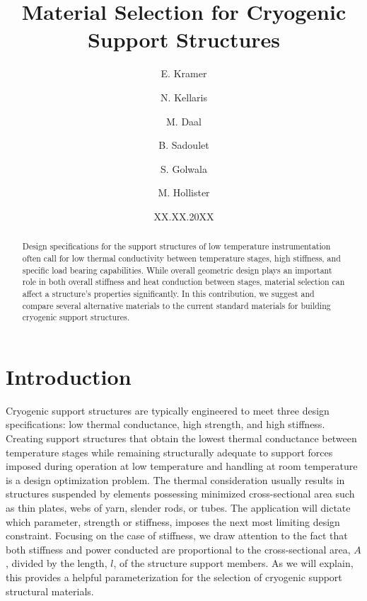 \documentclass[final]{svjour2}
\begin{document}
\newcommand{\hdblarrow}{H\makebox[0.9ex][l]{$\downdownarrows$}-}
\title{Material Selection for Cryogenic Support Structures}

\author{E. Kramer \and N. Kellaris  \and M. Daal  \and B. Sadoulet \and S. Golwala \and M. Hollister}


\date{XX.XX.20XX}

\maketitle

\begin{abstract}

Design specifications for the support structures of low temperature instrumentation often call for low thermal conductivity between temperature stages, high stiffness, and specific load bearing capabilities.  While overall geometric design plays an important role in both overall stiffness and heat conduction between stages, material selection can affect a structure's properties significantly.  In this contribution, we suggest and compare several alternative materials to the current standard materials for building cryogenic support structures.


\end{abstract}

\section{Introduction}

Cryogenic support structures are typically engineered to meet three design specifications: low thermal conductance, high strength, and high stiffness. Creating support structures that obtain the lowest thermal conductance between temperature stages while remaining structurally adequate to support forces imposed during operation at low temperature and handling at room temperature is a design optimization problem. The thermal consideration usually results in structures suspended by elements possessing minimized cross-sectional area such as thin plates, webs of yarn, slender rods, or tubes. The application will dictate which parameter, strength or stiffness, imposes the next most limiting design constraint. Focusing on the case of stiffness, we draw attention to the fact that both stiffness and power conducted are proportional to the cross-sectional area, $A$, divided by the length, $l$, of the structure support members.\cite{Hastings1993} As we will explain, this provides a helpful parameterization for the selection of cryogenic support structural materials.
\end{document}
